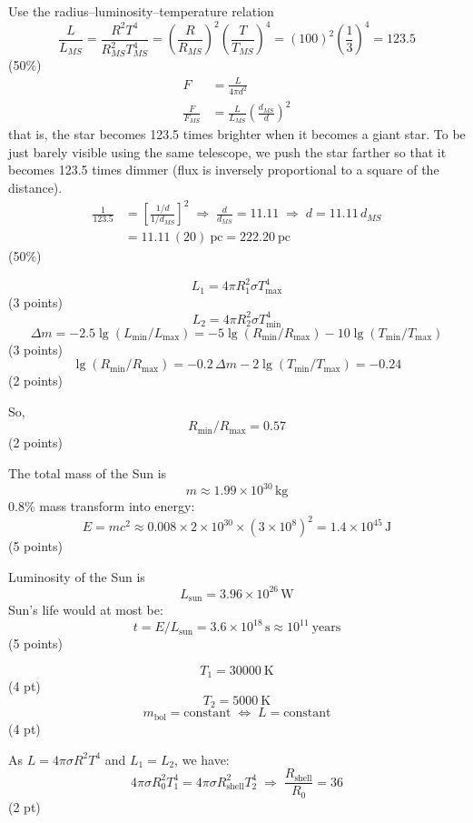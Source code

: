 Use the radius--luminosity--temperature relation
\[
  \frac{L}{L_{MS}} = \frac{R^2 T^4}{R_{MS}^2 T_{MS}^4}
    = \left(\frac{R}{R_{MS}}\right)^{\!2}\left(\frac{T}{T_{MS}}\right)^{\!4}
    = \left(100\right)^2 \left(\frac{1}{3}\right)^{\!4} = 123.5
\]
\hfill(50\%)
\begin{align*}
  F &= \frac{L}{4\pi d^2} \\
  \frac{F}{F_{MS}} &= \frac{L}{L_{MS}}\left(\frac{d_{MS}}{d}\right)^{\!2}
\end{align*}
that is, the star becomes 123.5 times brighter when it becomes a giant star. To
be just barely visible using the same telescope, we push the star farther so
that it becomes 123.5 times dimmer (flux is inversely proportional to a square
of the distance).
\begin{align*}
  \frac{1}{123.5} &= \left[\frac{1/d}{1/d_{MS}}\right]^{2}
  \;\Longrightarrow\; \frac{d}{d_{MS}} = 11.11
  \;\Longrightarrow\; d = 11.11\,d_{MS} \\
  &= 11.11\,(20)\ \text{pc} = 222.20\ \text{pc}
\end{align*}
\hfill(50\%)

\[
  L_1 = 4\pi R_1^2 \sigma T_{\max}^4
\]
\hfill(3 points)
\[
  L_2 = 4\pi R_2^2 \sigma T_{\min}^4
\]
\[
  \Delta m = -2.5\lg(L_{\min}/L_{\max})
           = -5\lg(R_{\min}/R_{\max}) - 10\lg(T_{\min}/T_{\max})
\]
\hfill(3 points)
\[
  \lg(R_{\min}/R_{\max}) = -0.2\,\Delta m - 2\lg(T_{\min}/T_{\max}) = -0.24
\]
\hfill(2 points)

So,
\[
  R_{\min}/R_{\max} = 0.57
\]
\hfill(2 points)

The total mass of the Sun is
\[
  m \approx 1.99 \times 10^{30}\,\mathrm{kg}
\]
0.8\% mass transform into energy:
\[
  E = mc^2 \approx 0.008 \times 2 \times 10^{30} \times (3 \times 10^{8})^2
    = 1.4 \times 10^{45}\,\mathrm{J}
\]
\hfill(5 points)

Luminosity of the Sun is
\[
  L_{\mathrm{sun}} = 3.96 \times 10^{26}\,\mathrm{W}
\]
Sun's life would at most be:
\[
  t = E / L_{\mathrm{sun}} = 3.6 \times 10^{18}\,\mathrm{s} \approx 10^{11}\ \text{years}
\]
\hfill(5 points)

\[
  T_1 = 30000\ \mathrm{K}
\]
\hfill(4 pt)
\[
  T_2 = 5000\ \mathrm{K}
\]
\[
  m_{\mathrm{bol}} = \text{constant} \;\Longleftrightarrow\; L = \text{constant}
\]
\hfill(4 pt)

As $L = 4\pi\sigma R^2 T^4$ and $L_1 = L_2$, we have:
\[
  4\pi\sigma R_0^2 T_1^4 = 4\pi\sigma R_{\mathrm{shell}}^2 T_2^4
  \;\Longrightarrow\; \frac{R_{\mathrm{shell}}}{R_0} = 36
\]
\hfill(2 pt)

